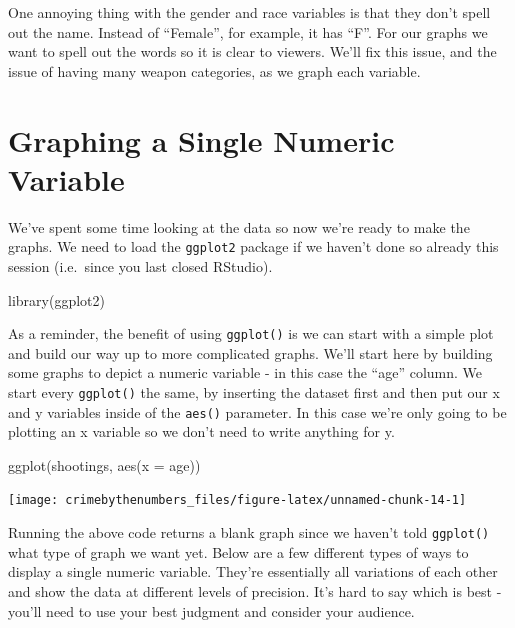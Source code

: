\documentclass[
]{krantz}
\makeatletter
\newenvironment{Shaded}{\begin{snugshade}}{\end{snugshade}}
\newcommand{\AttributeTok}[1]{\textcolor[rgb]{0.61,0.61,0.61}{#1}}
\newcommand{\FunctionTok}[1]{\textcolor[rgb]{0,0,0}{#1}}
\newcommand{\NormalTok}[1]{#1}
\newenvironment{kframe}{%
\medskip{}
\setlength{\fboxsep}{.8em}
 \def\at@end@of@kframe{}%
 \ifinner\ifhmode%
  \def\at@end@of@kframe{\end{minipage}}%
  \begin{minipage}{\columnwidth}%
 \fi\fi%
 \def\FrameCommand##1{\hskip\@totalleftmargin \hskip-\fboxsep
 \colorbox{shadecolor}{##1}\hskip-\fboxsep
     \hskip-\linewidth \hskip-\@totalleftmargin \hskip\columnwidth}%
 \MakeFramed {\advance\hsize-\width
   \@totalleftmargin\z@ \linewidth\hsize
   \@setminipage}}%
 {\par\unskip\endMakeFramed%
 \at@end@of@kframe}
\renewenvironment{Shaded}{\begin{kframe}}{\end{kframe}}
\makeatother
\begin{document}
One annoying thing with the gender and race variables is that they don't spell out the name. Instead of ``Female'', for example, it has ``F''. For our graphs we want to spell out the words so it is clear to viewers. We'll fix this issue, and the issue of having many weapon categories, as we graph each variable.

\hypertarget{graphing-a-single-numeric-variable}{%
\section{Graphing a Single Numeric Variable}\label{graphing-a-single-numeric-variable}}

We've spent some time looking at the data so now we're ready to make the graphs. We need to load the \texttt{ggplot2} package if we haven't done so already this session (i.e.~since you last closed RStudio).

\begin{Shaded}
\begin{Highlighting}[]
\FunctionTok{library}\NormalTok{(ggplot2)}
\end{Highlighting}
\end{Shaded}

As a reminder, the benefit of using \texttt{ggplot()} is we can start with a simple plot and build our way up to more complicated graphs. We'll start here by building some graphs to depict a numeric variable - in this case the ``age'' column. We start every \texttt{ggplot()} the same, by inserting the dataset first and then put our x and y variables inside of the \texttt{aes()} parameter. In this case we're only going to be plotting an x variable so we don't need to write anything for y.

\begin{Shaded}
\begin{Highlighting}[]
\FunctionTok{ggplot}\NormalTok{(shootings, }\FunctionTok{aes}\NormalTok{(}\AttributeTok{x =}\NormalTok{ age))}
\end{Highlighting}
\end{Shaded}

\begin{center}\texttt{[image: crimebythenumbers\_files/figure-latex/unnamed-chunk-14-1]} \end{center}

Running the above code returns a blank graph since we haven't told \texttt{ggplot()} what type of graph we want yet. Below are a few different types of ways to display a single numeric variable. They're essentially all variations of each other and show the data at different levels of precision. It's hard to say which is best - you'll need to use your best judgment and consider your audience.
\end{document}
